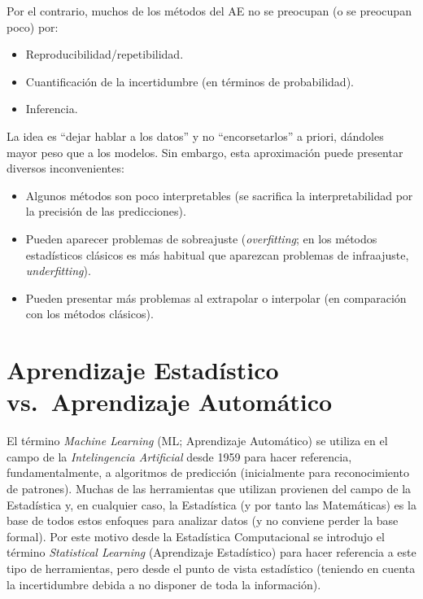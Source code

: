 \documentclass[
  spanish,
]{book}
\theoremstyle{break}
\theoremstyle{definition}
\theoremstyle{definition}
\theoremstyle{definition}
\theoremstyle{definition}
\theoremstyle{remark}
\begin{document}
Por el contrario, muchos de los métodos del AE no se preocupan (o se preocupan poco) por:

\begin{itemize}
\item
  Reproducibilidad/repetibilidad.
\item
  Cuantificación de la incertidumbre (en términos de probabilidad).
\item
  Inferencia.
\end{itemize}

La idea es ``dejar hablar a los datos'' y no ``encorsetarlos'' a priori, dándoles mayor peso que a los modelos.
Sin embargo, esta aproximación puede presentar diversos inconvenientes:

\begin{itemize}
\item
  Algunos métodos son poco interpretables (se sacrifica la interpretabilidad por la precisión de las predicciones).
\item
  Pueden aparecer problemas de sobreajuste (\emph{overfitting}; en los métodos estadísticos clásicos es más habitual que aparezcan problemas de infraajuste, \emph{underfitting}).
\item
  Pueden presentar más problemas al extrapolar o interpolar (en comparación con los métodos clásicos).
\end{itemize}

\hypertarget{aprendizaje-estaduxedstico-vs.-aprendizaje-automuxe1tico}{%
\section{Aprendizaje Estadístico vs.~Aprendizaje Automático}\label{aprendizaje-estaduxedstico-vs.-aprendizaje-automuxe1tico}}

El término \emph{Machine Learning} (ML; Aprendizaje Automático) se utiliza en el campo de la \emph{Intelingencia Artificial} desde 1959 para hacer referencia, fundamentalmente, a algoritmos de predicción (inicialmente para reconocimiento de patrones).
Muchas de las herramientas que utilizan provienen del campo de la Estadística y, en cualquier caso, la Estadística (y por tanto las Matemáticas) es la base de todos estos enfoques para analizar datos (y no conviene perder la base formal).
Por este motivo desde la Estadística Computacional se introdujo el término \emph{Statistical Learning} (Aprendizaje Estadístico) para hacer referencia a este tipo de herramientas, pero desde el punto de vista estadístico (teniendo en cuenta la incertidumbre debida a no disponer de toda la información).
\end{document}

